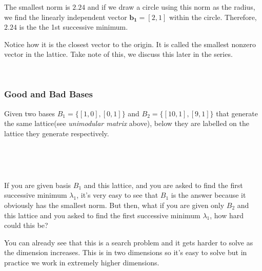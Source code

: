\documentclass[11pt]{article}
\begin{document}
The smallest norm is \(2.24\) and if we draw a circle using this norm as
the radius, we find the linearly independent vector
\(\mathbf{b_1} = [2, 1]\) within the circle. Therefore, \(2.24\) is the
the 1st successive minimum.

Notice how it is the closest vector to the origin. It is called the
smallest nonzero vector in the lattice. Take note of this, we discuss
this later in the series.

    \begin{center}
    \end{center}
    { \hspace*{\fill} \\}
    
    \subsubsection{Good and Bad Bases}\label{good-and-bad-bases}

Given two bases \(B_1 = \{ [1, 0], [0, 1] \}\) and
\(B_2 = \{[10, 1], [9, 1] \}\) that generate the same lattice(see
\emph{unimodular matrix} above), below they are labelled on the lattice
they generate respectively.

    \begin{center}
    \end{center}
    { \hspace*{\fill} \\}
    
    \begin{center}
    \end{center}
    { \hspace*{\fill} \\}
    
    If you are given basis \(B_1\) and this lattice, and you are asked to
find the first successive minimum \(\lambda_{1}\), it's very easy to see
that \(B_1\) is the answer because it obviously has the smallest norm.
But then, what if you are given only \(B_2\) and this lattice and you
asked to find the first successive minimum \(\lambda_1\), how hard could
this be?

You can already see that this is a search problem and it gets harder to
solve as the dimension increases. This is in two dimensions so it's easy
to solve but in practice we work in extremely higher dimensions.
\end{document}
